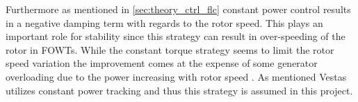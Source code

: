 \smallskip
Furthermore as mentioned in \cref{sec:theory_ctrl_flc} constant power control results in a negative damping term with regards to the rotor speed. This plays an important role for stability since this strategy can result in over-speeding of the rotor in FOWTs. While the constant torque strategy seems to limit the rotor speed variation the improvement comes at the expense of some generator overloading due to the power increasing with rotor speed \cite{Jonkman2010}. As mentioned Vestas utilizes constant power tracking and thus this strategy is assumed in this project.